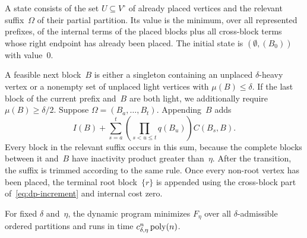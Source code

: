 \documentclass[12pt,a4paper,oneside]{report}
\begin{document}
A state consists of the set $U\subseteq V^\circ$ of already placed vertices and the
relevant suffix~$\Omega$ of their partial partition.  Its value is the minimum,
over all represented prefixes, of the internal terms of the placed blocks plus
all cross-block terms whose right endpoint has already been placed.  The
initial state is $(\emptyset,(B_0))$ with value~$0$.

A feasible next block~$B$ is either a singleton containing an unplaced $\delta$-heavy
vertex or a nonempty set of unplaced light vertices with
$\mu(B)\le\delta$.  If the last block of the current prefix and~$B$ are both
light, we additionally require $\mu(B)\ge\delta/2$.  Suppose
$\Omega=(B_a,\dots,B_t)$.  Appending~$B$ adds
\begin{equation}\label{eq:dp-increment}
    I(B)
    +
    \sum_{s=a}^t
    \left(\prod_{s<u\le t}q(B_u)\right)C(B_s,B).
\end{equation}
Every block in the relevant suffix occurs in this sum, because the complete
blocks between it and~$B$ have inactivity product greater than~$\eta$.
After the transition, the suffix is trimmed according to the same rule.  Once
every non-root vertex has been placed, the terminal root block~$\{r\}$ is appended
using the cross-block part of~\cref{eq:dp-increment} and internal cost zero.

\begin{lemma}\label{lem:local-dp}
For fixed $\delta$ and~$\eta$, the dynamic program minimizes
$F_\eta$ over all $\delta$-admissible ordered partitions and runs in time
$c_{\delta,\eta}^n\operatorname{poly}(n)$.
\end{lemma}
\end{document}
